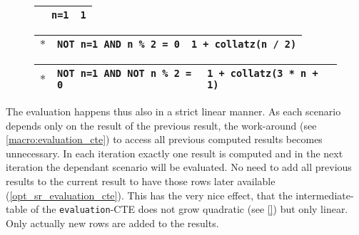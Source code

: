 \begin{figure}[h]
    \centering
    \begin{minipage}[b]{.45\linewidth}
    \centering
    \label{lst:collatz_udf}
    \end{minipage}
    \begin{minipage}[b]{.5\linewidth}
    \centering\scriptsize
        \begin{tabular}{|p{1em}|p{3.3cm}|p{2.9cm}|}\hline
        \cellcolor{gray!25} & \texttt{\phantom{NOT }n=1} & \texttt{1}\\\hline
        \end{tabular}
        
        \begin{tabular}{|p{1em}|p{3.3cm}|p{2.9cm}|}\hline
        \cellcolor{gray!25} $\ast$ & \texttt{NOT n=1 AND \phantom{NOT }n \% 2 = 0} & \texttt{1 + collatz(n / 2)}\\\hline
        \end{tabular}
        
        \begin{tabular}{|p{1em}|p{3.3cm}|p{2.9cm}|}\hline
        \cellcolor{gray!25} $\ast$ & \texttt{NOT n=1 AND NOT n \% 2 = 0} & \texttt{1 + collatz(3 * n + 1)}\\\hline
        \end{tabular}
        \vspace{2em}
    \label{collatz_scenarios}
    \end{minipage}
    \caption{}
    \label{collatz_sql_with_scenarios}
\end{figure}

The evaluation happens thus also in a strict linear manner. As each scenario depends only on the result of the previous result, the work-around (see \autoref{macro:evaluation_cte}) to access all previous computed results becomes unnecessary. In each iteration exactly one result is computed and in the next iteration the dependant scenario will be evaluated. No need to add all previous results to the current result to have those rows later available (\autoref{opt_sr_evaluation_cte}). This has the very nice effect, that the intermediate-table of the \texttt{evaluation}-CTE does not grow quadratic (see \autoref{}) but only linear. Only actually new rows are added to the results.

